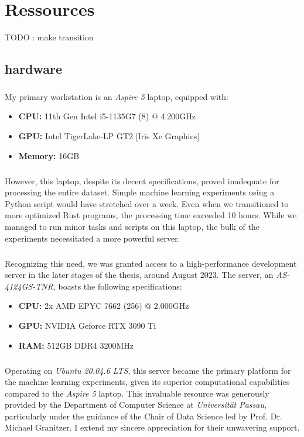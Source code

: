 \chapter{Ressources}\label{chap:ressources}

TODO : make transition

\section{hardware}
\paragraph{}My primary workstation is an \textit{Aspire 5} laptop, equipped with:
\begin{itemize}
    \item \textbf{CPU:} 11th Gen Intel i5-1135G7 (8) @ 4.200GHz 
    \item \textbf{GPU:} Intel TigerLake-LP GT2 [Iris Xe Graphics]
    \item \textbf{Memory:} 16GB
\end{itemize}
\paragraph{}However, this laptop, despite its decent specifications, proved inadequate for processing the entire dataset. Simple machine learning experiments using a Python script would have stretched over a week. Even when we transitioned to more optimized Rust programs, the processing time exceeded 10 hours. While we managed to run minor tasks and scripts on this laptop, the bulk of the experiments necessitated a more powerful server.

\paragraph{}Recognizing this need, we was granted access to a high-performance development server in the later stages of the thesis, around August 2023. The server, an \textit{AS-4124GS-TNR}, boasts the following specifications:
\begin{itemize}
    \item \textbf{CPU:} 2x AMD EPYC 7662 (256) @ 2.000GHz
    \item \textbf{GPU:} NVIDIA Geforce RTX 3090 Ti
    \item \textbf{RAM:} 512GB DDR4 3200MHz
\end{itemize}
\paragraph{}Operating on \textit{Ubuntu 20.04.6 LTS}, this server became the primary platform for the machine learning experiments, given its superior computational capabilities compared to the \textit{Aspire 5} laptop. This invaluable resource was generously provided by the Department of Computer Science at \textit{Universität Passau}, particularly under the guidance of the Chair of Data Science led by Prof. Dr. Michael Granitzer. I extend my sincere appreciation for their unwavering support.


